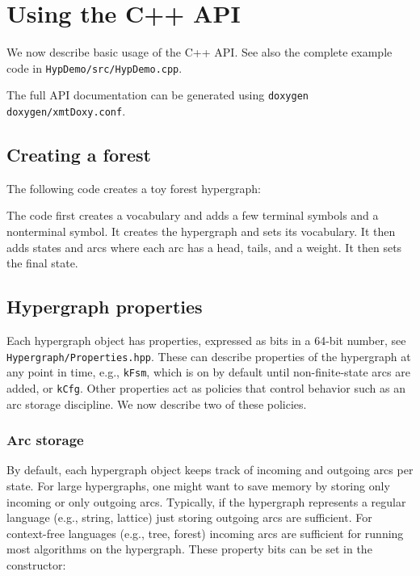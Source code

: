 \documentclass[12pt]{article}
\newcommand{\yellowlisting}[1]{%
  }
\newcommand{\code}[1]{\texttt{#1}}
\begin{document}
\section{Using the C++ API}

We now describe basic usage of the C++ API. See also the complete
example code in \texttt{HypDemo/src/HypDemo.cpp}.

The full API documentation can be generated using \code{doxygen doxygen/xmtDoxy.conf}.

\subsection{Creating a forest}\label{sec:creating-forest}

The following code creates a toy forest hypergraph:

\lstset{
  language=C++,
  numbers=left
}
\yellowlisting{CreateForest.hpp}

The code first creates a vocabulary and adds a few terminal symbols
and a nonterminal symbol. It creates the hypergraph and sets its
vocabulary. It then adds states and arcs where each arc has a head,
tails, and a weight. It then sets the final state.

\subsection{Hypergraph properties}

Each hypergraph object has properties, expressed as bits in a 64-bit
number, see \texttt{Hypergraph/Properties.hpp}. These can describe
properties of the hypergraph at any point in time, e.g.,
\texttt{kFsm}, which is on by default until non-finite-state arcs are
added, or \texttt{kCfg}. Other properties act as policies that control
behavior such as an arc storage discipline. We now describe two of
these policies.

\subsubsection{Arc storage}

By default, each hypergraph object keeps track of incoming and
outgoing arcs per state. For large hypergraphs, one might want to save
memory by storing only incoming or only outgoing arcs. Typically, if
the hypergraph represents a regular language (e.g., string, lattice)
just storing outgoing arcs are sufficient. For context-free languages
(e.g., tree, forest) incoming arcs are sufficient for running most
algorithms on the hypergraph. These property bits can be set in the
constructor:
\end{document}
